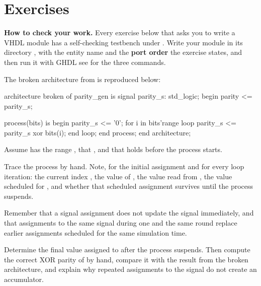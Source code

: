 
\section{Exercises}
\label{c5:sec:exercises}

\begin{aside}
\textbf{How to check your work.} Every exercise below that asks you to write a VHDL module has a
self-checking testbench under . Write your module in its directory
, with the entity name and the \textbf{port order} the exercise states,
and then run it with GHDL \textemdash{} see  for the three commands.
\end{aside}


\label{c5:ex:trace}
The broken  architecture from  is reproduced below:

\begin{vhdlcode}
architecture broken of parity_gen is
signal parity_s: std_logic;
begin
    parity <= parity_s;

    process(bits) is
    begin
        parity_s <= '0';
        for i in bits'range loop
            parity_s <= parity_s xor bits(i);
        end loop;
    end process;
end architecture;
\end{vhdlcode}

Assume  has the range , that , and that
 holds  before the process starts.

 Trace the process by hand. Note, for the initial assignment and for every loop iteration:
the current index , the value of , the value read from , the
value scheduled for , and whether that scheduled assignment survives until the
process suspends.

Remember that a signal assignment does not update the signal immediately, and that assignments to
the same signal during one and the same round replace earlier assignments scheduled for the same
simulation time.

 Determine the final value assigned to  after the process suspends. Then
compute the correct XOR parity of  by hand, compare it with the result from the
broken architecture, and explain why repeated assignments to the signal do not create an
accumulator.

